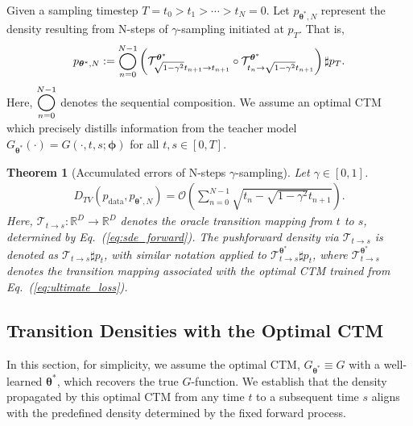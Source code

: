 \documentclass{article} \usepackage{iclr2024_coNFErence,times}
\def\eqref#1{equation~\ref{#1}}
\newcommand{\comp}[2]{\overset{#2}{\underset{{#1}}{\TikCircle}}}
\newcommand\TikCircle[1][2.5]{\tikz[baseline=-#1]{\draw[thick](0,0)circle[radius=#1mm];}}
\def\eqref#1{(\ref{#1})}
\def\eqref#1{(\ref{#1})}
\newtheorem{theorem}{Theorem}\newtheorem{proposition}[theorem]{Proposition}
\theoremstyle{definition}
\theoremstyle{remark}
\begin{document}
Given a sampling timestep  $T=t_0>t_1>\cdots>t_N=0$. Let $p_{\bm{\theta}^*, N}$ represent the density resulting from N-steps of $\gamma$-sampling initiated at $p_T$. That is, 
\begin{align*}
    p_{\bm{\theta}^*, N}:=\comp{n=0}{N-1}\left(\mathcal{T}_{\sqrt{1-\gamma^2}t_{n+1}\rightarrow t_{n+1}}^{\bm{\theta}^* }\circ\mathcal{T}_{t_n \rightarrow\sqrt{1-\gamma^2}t_{n+1}}^{\bm{\theta}^* }\right) \sharp p_T.    
\end{align*}
Here, $\comp{n=0}{N-1}$ denotes the sequential composition. We assume an optimal CTM which precisely distills information from the teacher model $G_{\bm{\theta}^*}(\cdot)=G(\cdot, t, s; \bm{\phi})$ for all $t, s\in[0,T]$.



\begin{theorem}[Accumulated errors of N-steps $\gamma$-sampling]\label{th:sampling_agg_error_N_steps}
Let $\gamma \in [0,1]$.
\begin{align*}
    D_{TV}\left(p_{\text{data}}, p_{\bm{\theta}^*, N} 
     \right)
     = \mathcal{O}\left(\sum_{n=0}^{N-1}\sqrt{t_n -\sqrt{1-\gamma^2}t_{n+1}}\right).
\end{align*}
Here, $\mathcal{T}_{t\rightarrow s}\colon\mathbb{R}^D\rightarrow\mathbb{R}^D$ denotes the oracle transition mapping from $t$ to $s$, determined by Eq.~\eqref{eq:sde_forward}. The pushforward density via $\mathcal{T}_{t\rightarrow s}$ is denoted as $\mathcal{T}_{t\rightarrow s}\sharp p_t$, with similar notation applied to $\mathcal{T}_{t\rightarrow s}^{\bm{\theta}^*}\sharp p_t$, where $\mathcal{T}_{t\rightarrow s}^{\bm{\theta}^*}$ denotes the transition mapping associated with the optimal CTM trained from Eq.~\eqref{eq:ultimate_loss}.

    
\end{theorem}










\subsection{Transition Densities with the Optimal CTM}
In this section, for simplicity, we assume the optimal CTM, $G_{\bm{\theta}^*}\equiv G$ with a well-learned $\bm{\theta}^*$, which recovers the true $G$-function. We establish that the density propagated by this optimal CTM from any time $t$ to a subsequent time $s$ aligns with the predefined density determined by the fixed forward process. 
\end{document}
